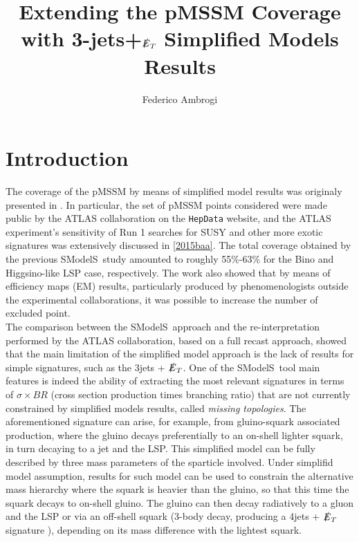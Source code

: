\documentclass[a4paper,11pt]{article}
\title{\boldmath Extending the pMSSM Coverage with 3-jets+$\slashed{E}_T$ Simplified Models Results}
\author[a]{Federico Ambrogi}
\affiliation[a]{University of Vienna, Faculty of Physics, Bolzmanngasse 5, A-1090 Wien, Austria}
\newcommand{\SMO}{{\sc SModelS}}
\begin{document}
 
\maketitle
                
                                           

\sffamily
\flushbottom

\section{Introduction}

The coverage of the pMSSM by means of simplified model results was originaly presented in \cite{Ambrogi:2017lov}. In particular, the set of pMSSM points considered were made public by the ATLAS collaboration on the \texttt{HepData} website\cite{ATLASpMSSMhepdata}, and the ATLAS experiment's sensitivity of Run 1 searches for SUSY and other more exotic signatures was extensively discussed in \ref{2015baa}. The total coverage obtained by the previous \SMO~study amounted to roughly 55$\%$-63$\%$ for the Bino and Higgsino-like LSP case, respectively. The work also showed that by means of efficiency maps (EM) results, particularly produced by phenomenologists outside the experimental collaborations, it was possible to increase the number of excluded point.
\\
The comparison between the \SMO~approach and the re-interpretation performed by the ATLAS collaboration, based on a full recast approach, showed that the main limitation of the simplified model approach is the lack of results for simple signatures, such as the 3jets + $\slashed{E}_T$. One of the \SMO~tool main features is indeed the ability of extracting the most relevant signatures in terms of $\sigma \times BR$ (cross section production times branching ratio) that are not currently constrained by simplified models results, called \textit{missing topologies}. The aforementioned signature can arise, for example, from gluino-squark associated production, where the gluino decays preferentially to an on-shell lighter squark, in turn decaying to a jet and the LSP. This simplified model can be fully described by three mass parameters of the sparticle involved. Under simplifid model assumption, results for such model can be used to constrain the alternative mass hierarchy where the squark is heavier than the gluino, so that this time the squark decays to on-shell gluino. The gluino can then decay radiatively to a gluon and the LSP or via an off-shell squark (3-body decay, producing a 4jets + $\slashed{E}_T$ signature ), depending on its mass difference with the lightest squark. 
\end{document}
